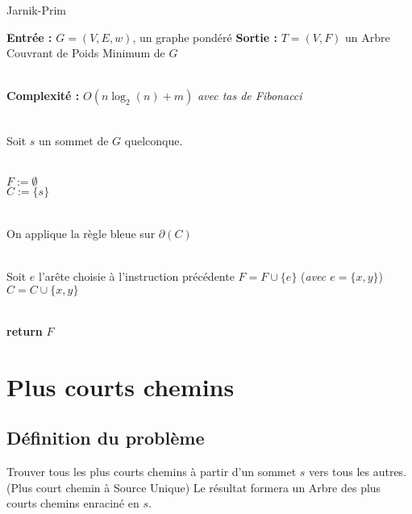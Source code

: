 \documentclass{article}      %
\begin{document}
\begin{algorithm}[H] \caption{Jarnik-Prim}
\begin{algorithmic}

\State \textbf{Entrée :} $G = (V, E, w)$, un graphe pondéré
\State \textbf{Sortie :} $T = (V, F)$ un Arbre Couvrant de Poids Minimum de $G$

\\ \State \textbf{Complexité :} $O(n\log_2(n) + m)$ \textit{avec tas de Fibonacci} 

\\ \State Soit $s$ un sommet de $G$ quelconque.

\\ \State $F := \emptyset$
\\ \State $C := \{s\}$

\\
    \State On applique la règle bleue sur $\partial(C)$
    
    \\ \State Soit $e$ l'arête choisie à l'instruction précédente
    \State $F = F \cup \{e\}$ (\textit{avec $e = \{x, y\}$})
    \State $C = C \cup \{x, y\}$
\EndWhile

\\ \State \textbf{return} $F$
\end{algorithmic}
\end{algorithm}


\section{Plus courts chemins}
\subsection{Définition du problème}
Trouver tous les plus courts chemins à partir d’un sommet $s$ vers tous les autres.
(Plus court chemin à Source Unique)
Le résultat formera un Arbre des plus courts chemins enraciné en $s$.
\end{document}
